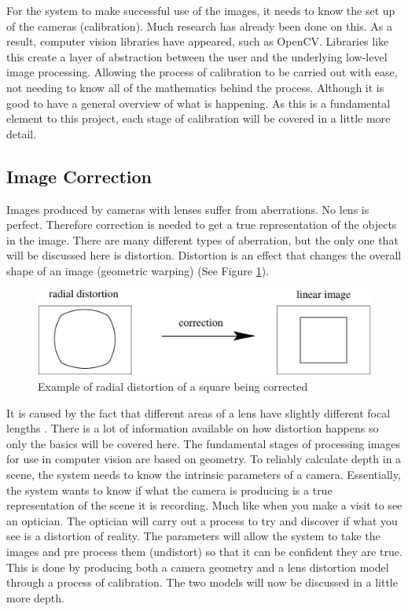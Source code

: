 \documentclass[11pt,oneside]{report}
\begin{document}
			For the system to make successful use of the images, it needs to know the set up of the cameras (calibration).
			Much research has already been done on this.
			As a result, computer vision libraries have appeared, such as OpenCV.
			Libraries like this create a layer of abstraction between the user and the underlying low-level image processing.
			Allowing the process of calibration to be carried out with ease, not needing to know all of the mathematics behind the process.
			Although it is good to have a general overview of what is happening.
			As this is a fundamental element to this project, each stage of calibration will be covered in a little more detail.
				\subsection{Image Correction}
				Images produced by cameras with lenses suffer from aberrations.
				No lens is perfect.
				Therefore correction is needed to get a true representation of the objects in the image.
				There are many different types of aberration, but the only one that will be discussed here is distortion.
				Distortion is an effect that changes the overall shape of an image (geometric warping) (See Figure \ref{fig:distortion}).
				\begin{figure}[!h]
				\begin{center}
					
    					\includegraphics[scale=0.5]{distortion_1}
    					\caption{Example of radial distortion of a square being corrected \protect\cite{book:multiViewGeo} {\label{fig:distortion}}}
    				\end{center}
				\end{figure}				
				It is caused by the fact that different areas of a lens have slightly different focal lengths \cite[p. 42]{book:modern}.
				There is a lot of information available on how distortion happens so only the basics will be covered here. %
				The fundamental stages of processing images for use in computer vision are based on geometry.
				To reliably calculate depth in a scene, the system needs to know the intrinsic %
				parameters of a camera.
				Essentially, the system wants to know if what the camera is producing is a true representation of the scene it is recording.
				Much like when you make a visit to see an optician. 
				The optician will carry out a process to try and discover if what you see is a distortion of reality.
				The parameters will allow the system to take the images and pre process them (undistort) so that it can be confident they are true.
				This is done by producing both a camera geometry and a lens distortion model through a process of calibration.  
				The two models will now be discussed in a little more depth.				
\end{document}
